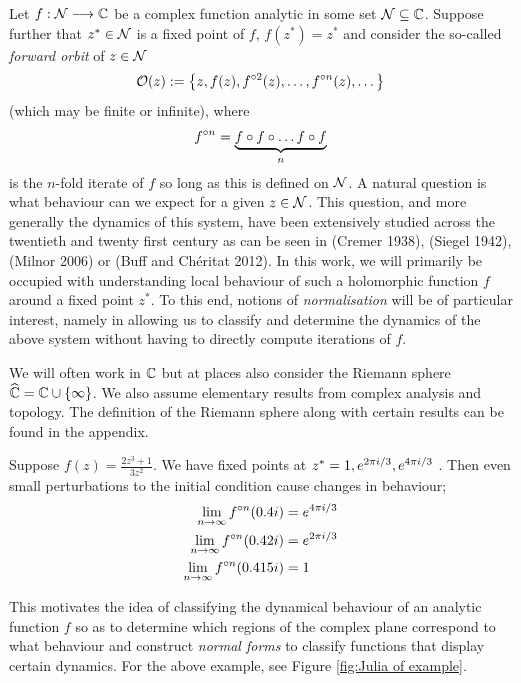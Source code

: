 \documentclass[../main.tex]{subfiles}
\begin{document}
Let $f : \mathcal{N} \longrightarrow \mathbb{C}$ be a complex function analytic in some set $\mathcal{N} \subseteq \mathbb{C}$. Suppose further that $z^* \in \mathcal{N}$ is a fixed point of $f$, $f(z^*) = z^*$ and consider the so-called \emph{forward orbit} of $z \in \mathcal{N}$
\[
\mathcal{O}(z) := \left\{z, f(z), f^{\circ2}(z), \dots, f^{\circ n}(z), \dots \right\}
\]
(which may be finite or infinite), where
\[
f^{\circ n} = \underbrace{f \circ f \circ \dots f \circ f}_\text{$n$}
\]
is the $n$-fold iterate of $f$ so long as this is defined on $\mathcal{N}$. A natural question is what behaviour can we expect for a given $z \in \mathcal{N}$. This question, and more generally the dynamics of this system, have been extensively studied across the twentieth and twenty first century as can be seen in (Cremer 1938), (Siegel 1942), (Milnor 2006) or (Buff and Ch\'eritat 2012). In this work, we will primarily be occupied with understanding local behaviour of such a holomorphic function $f$ around a fixed point $z^*$. To this end, notions of \emph{normalisation} will be of particular interest, namely in allowing us to classify and determine the dynamics of the above system without having to directly compute iterations of $f$.

We will often work in $\mathbb{C}$ but at places also consider the Riemann sphere $\widehat{\mathbb{C}} = \mathbb{C} \cup \{\infty\}$. We also assume elementary results from complex analysis and topology. The definition of the Riemann sphere along with certain results can be found in the appendix. 

\begin{exl}\label{ex 1.1}
Suppose $f(z) = \frac{2z^3+1}{3z^2}$. We have fixed points at $z^* = 1, e^{2\pi i/3}, e^{4\pi i/3} $ . Then even small perturbations to the initial condition cause changes in behaviour; 
\begin{align*}
  \lim_{n \rightarrow \infty} f^{\circ n}(0.4i) &= e^{4\pi i/3}\\
  \lim_{n \rightarrow \infty} f^{\circ n}(0.42i) &= e^{2\pi i/3} \\
\lim_{n \rightarrow \infty} f^{\circ n}(0.415i) &= 1  
\end{align*}
\end{exl}

This motivates the idea of classifying the dynamical behaviour of an analytic function $f$ so as to determine which regions of the complex plane correspond to what behaviour and construct \emph{normal forms} to classify functions that display certain dynamics. For the above example, see Figure \eqref{fig:Julia of example}.
\end{document}
